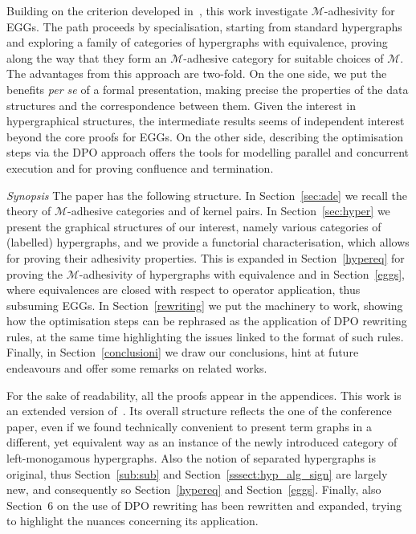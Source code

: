 \documentclass[3p]{elsarticle}
\theoremstyle{remark}
\theoremstyle{definition}
\begin{document}

Building on the criterion developed in~\cite{CastelnovoGM24}, this work 
investigate $\mathcal{M}$-adhesivity for EGGs. The path proceeds by 
specialisation, starting from standard hypergraphs and exploring a family of 
categories of hypergraphs with equivalence, proving along the way that 
they form an $\mathcal{M}$-adhesive category for suitable choices of $\mathcal{M}$.
The advantages from this approach are two-fold. On the one side, 
we put the benefits \emph{per se} of a formal presentation, making precise 
the properties of the data structures and the correspondence between them.
Given the interest in hypergraphical structures, the intermediate
results seems of independent interest beyond the core proofs for EGGs.
On the other side, describing the optimisation steps via the DPO approach
offers the tools for modelling  parallel and concurrent execution
and for proving  confluence and termination.

\emph{Synopsis}
The paper has the following structure. 
In Section~\ref{sec:ade} we recall 
the theory of $\mathcal{M}$-adhesive categories
and of kernel pairs.
In Section~\ref{sec:hyper} we present the graphical structures of our interest, 
 namely various categories of (labelled) hypergraphs, and we provide a
functorial characterisation, which allows for proving their adhesivity properties.
This is expanded in Section~\ref{hypereq} for proving the $\mathcal{M}$-adhesivity
of hypergraphs with equivalence and in Section~\ref{eggs}, where equivalences are 
closed with respect to operator application, thus subsuming EGGs.
%
In Section~\ref{rewriting} we put the machinery to work, showing how the optimisation steps
can be rephrased as the application of DPO rewriting rules, at the same time
highlighting the issues linked to the format of such rules.
%
Finally, in Section~\ref{conclusioni} we draw our conclusions, hint at future endeavours and offer some 
 remarks on related works.

For the sake of readability, all the proofs appear in the appendices. 
This work is an extended version of~\cite{uovadesive}.
Its overall structure reflects the one of the conference paper, 
even if we found technically convenient to present term graphs
in a different, yet equivalent way as an instance of the newly 
introduced category of  left-monogamous hypergraphs. Also the notion of separated 
hypergraphs is original, thus Section~\ref{sub:sub} and Section~\ref{sssect:hyp_alg_sign}
are largely new, and consequently so Section~\ref{hypereq}
and Section~\ref{eggs}.
%
Finally, also Section~6 on the use of DPO rewriting has been rewritten 
and expanded, trying to highlight the nuances concerning its application.
\end{document}
